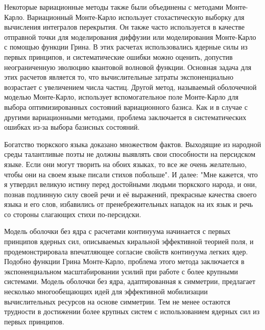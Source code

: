 \documentclass[fontsize=14pt]{scrreport}
\begin{document}
Некоторые вариационные методы также были объединены с методами Монте-Карло. Вариационный Монте-Карло использует стохастическую выборку для вычисления интегралов перекрытия. Он также часто используется в качестве отправной точки для моделирования диффузии или моделирования Монте-Карло с помощью функции Грина. В этих расчетах использовались ядерные силы из первых принципов, и систематические ошибки можно оценить, допустив неограниченную эволюцию квантовой волновой функции. Основная задача для этих расчетов является то, что вычислительные затраты экспоненциально возрастает с увеличением числа частиц. Другой метод, называемый оболочечной моделью Монте-Карло, использует вспомогательное поле Монте-Карло для выбора оптимизированных состояний вариационного базиса. Как и в случае с другими вариационными методами, проблема заключается в систематических ошибках из-за выбора базисных состояний. 

Богатство тюркского языка доказано множеством фактов. Выходящие из народной среды талантливые поэты не должны выявлять свои способности на персидском языке. Если они могут творить на обоих языках, то все же очень желательно, чтобы они на своем языке писали стихов побольше". И далее: "Мне кажется, что я утвердил великую истину перед достойными людьми тюркского народа, и они, познав подлинную силу своей речи и её выражений, прекрасные качества своего языка и его слов, избавились от пренебрежительных нападок на их язык и речь со стороны слагающих стихи по-персидски.

Модель оболочки без ядра с расчетами континуума начинается с первых принципов ядерных сил, описываемых киральной эффективной теорией поля, и продемонстрировала впечатляющее согласие свойств континуума легких ядер. Подобно функции Грина Монте-Карло, проблема этого метода заключается в экспоненциальном масштабировании усилий при работе с более крупными системами. Модель оболочки без ядра, адаптированная к симметрии, предлагает несколько многообещающих идей для эффективной мобилизации вычислительных ресурсов на основе симметрии. Тем не менее остаются трудности в достижении более крупных систем с использованием ядерных сил из первых принципов.
\end{document}
